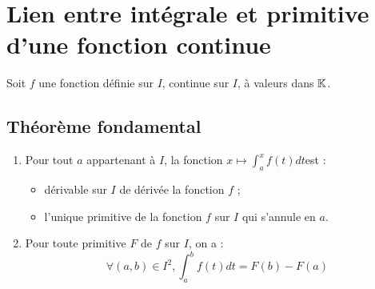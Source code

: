\section{Lien entre intégrale et primitive d’une fonction continue}
    Soit \(f\) une fonction définie sur \(I\), continue sur \(I\), à valeurs dans \(\mathbb{K}\).
\subsection{Théorème fondamental}
\begin{theo}
    \begin{enumerate}
        \item Pour tout \(a\) appartenant à \(I\), la fonction \(x \mapsto \int^x_a f (t) dt \)est :
        \begin{itemize}
            \item dérivable sur \(I\) de dérivée la fonction \(f\) ;
            \item l’unique primitive de la fonction \(f\) sur \(I\) qui s’annule en \(a\).
        \end{itemize}
        \item Pour toute primitive \(F\) de \(f\) sur \(I\), on a :
        \[\forall (a, b) \in  I^2,\int^b_a f (t) dt = F (b) -  F (a)\]
    \end{enumerate}
\end{theo}
